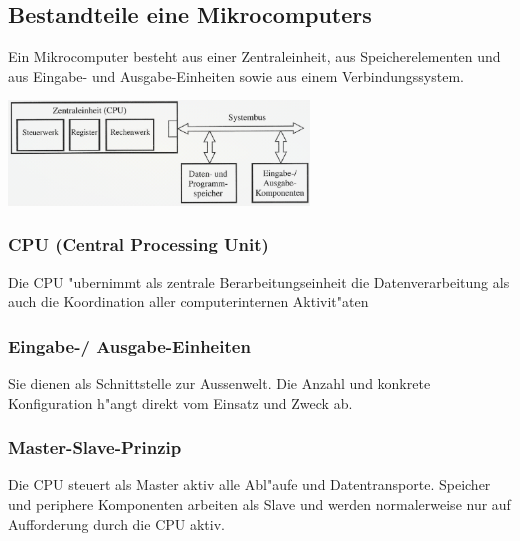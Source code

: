 \subsection{Bestandteile eine Mikrocomputers}
Ein Mikrocomputer besteht aus einer Zentraleinheit, aus Speicherelementen und aus Eingabe- und Ausgabe-Einheiten sowie aus einem Verbindungssystem.

\includegraphics[width = 8cm]{pics/Mikrocomputer}

\begin{minipage}[t]{8.5cm}
	\subsubsection{CPU (Central Processing Unit)}
	Die CPU "ubernimmt als zentrale Berarbeitungseinheit die Datenverarbeitung als auch die Koordination aller computerinternen Aktivit"aten\\
	
	\subsubsection{Eingabe-/ Ausgabe-Einheiten}
	Sie dienen als Schnittstelle zur Aussenwelt. Die Anzahl und konkrete Konfiguration h"angt direkt vom Einsatz und Zweck ab.\\
	
	\subsubsection{Master-Slave-Prinzip}
	Die CPU steuert als Master aktiv alle Abl"aufe und Datentransporte. Speicher und periphere Komponenten arbeiten als Slave und werden normalerweise nur auf Aufforderung durch die CPU aktiv.
\end{minipage}
%
\begin{minipage}{1cm}
	\ \
\end{minipage}
%
